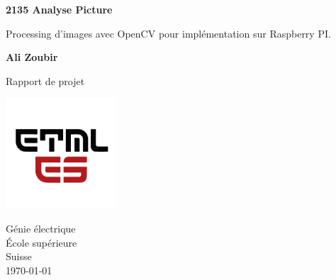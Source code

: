 \begin{titlepage}
   \begin{center}
        \vspace*{1cm}
        \LARGE
        {\Huge \textbf{2135 Analyse Picture}}
        
        \vspace{0.3cm}
        Processing d'images avec OpenCV pour implémentation sur Raspberry PI.
            
        \vspace{1.5cm}

        \textbf{Ali Zoubir}

        \vfill
            
        Rapport de projet
            
        \vspace{0.8cm}
     
        \includegraphics[width=0.31\textwidth]{ETML-ES-LOGO.png}

        Génie électrique\\
        École supérieure\\
        Suisse\\
        \monthyeardate\today
            
   \end{center}

\end{titlepage}
